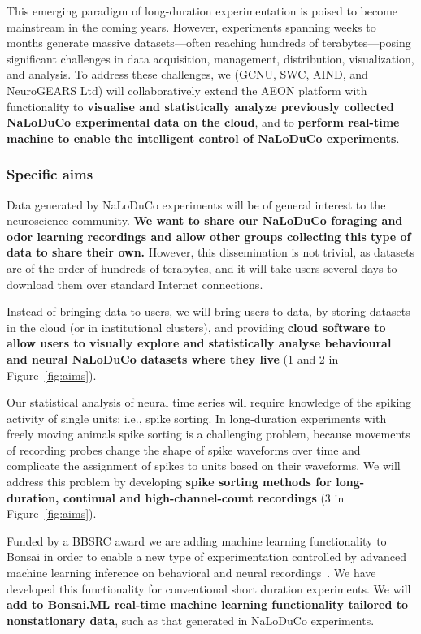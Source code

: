 This emerging paradigm of long-duration experimentation is poised to become
mainstream in the coming years.
%
However, experiments spanning weeks to months generate massive datasets—often
reaching hundreds of terabytes—posing significant challenges in data
acquisition, management, distribution, visualization, and analysis.
%
To address these challenges, we (GCNU, SWC, AIND, and NeuroGEARS Ltd) will
collaboratively extend the AEON platform with functionality to
\textbf{visualise and statistically analyze previously collected NaLoDuCo
experimental data on the cloud}, and to \textbf{perform real-time machine to enable the
intelligent control of NaLoDuCo experiments}.

\subsubsection{Specific aims}

Data generated by NaLoDuCo experiments will be of general interest to the
neuroscience community. \textbf{We want to share our NaLoDuCo foraging and odor
learning recordings and allow other groups collecting this type of data to
share their own.}
%
However, this dissemination is not trivial, as datasets are of the order of
hundreds of terabytes, and it will take users several days to download them
over standard Internet connections.

Instead of bringing data to users, we will bring users to data, by storing
datasets in the cloud (or in institutional clusters), and providing
\textbf{cloud software to allow users to visually explore and statistically
analyse behavioural and neural NaLoDuCo datasets where they live}
(1 and 2 in Figure~\ref{fig:aims}).

Our statistical analysis of neural time series will require knowledge of the
spiking activity of single units; i.e., spike sorting. In long-duration
experiments with freely moving animals spike sorting is a challenging problem,
because movements of recording probes change the shape of spike waveforms over
time and complicate the assignment of spikes to units based on their waveforms.
We will address this problem by developing \textbf{spike sorting methods for
long-duration, continual and high-channel-count recordings} (3 in
Figure~\ref{fig:aims}).

Funded by a BBSRC award we are adding machine learning functionality to Bonsai
in order to enable a new type of experimentation controlled by advanced machine
learning inference on behavioral and neural
recordings~\citep[Bonsai.ML,][]{bonsaiML25}. We have developed this
functionality for conventional short duration experiments. We will
\textbf{add to Bonsai.ML real-time machine learning functionality tailored to
nonstationary data}, such as that generated in NaLoDuCo experiments.

